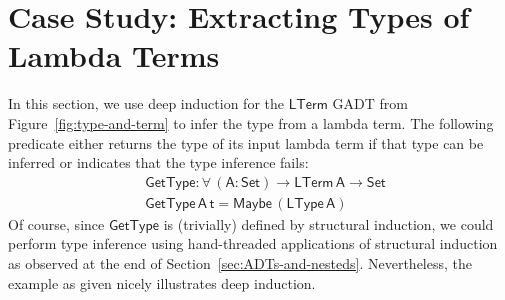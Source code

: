\documentclass[sigplan,screen]{acmart}
\begin{document}
\section{Case Study: Extracting Types of Lambda Terms}\label{sec:app}

In this section, we use deep induction for the $\mathsf{LTerm}$ GADT
from Figure~\ref{fig:type-and-term} to infer the type from a lambda
term. The following predicate either returns the type of its input
lambda term if that type can be inferred or indicates that the type
inference fails:
\begin{align*}
  &\mathsf{GetType : \forall \, (A : Set) \to LTerm\,A \to Set} \\
  &\mathsf{GetType \,A \,t = Maybe \, (LType \, A)}
\end{align*}
Of course, since $\mathsf{GetType}$ is (trivially) defined by
structural induction, we could perform type inference using
hand-threaded applications of structural induction as observed at the
end of Section~\ref{sec:ADTs-and-nesteds}. Nevertheless, the example
as given nicely illustrates deep induction.
\end{document}
